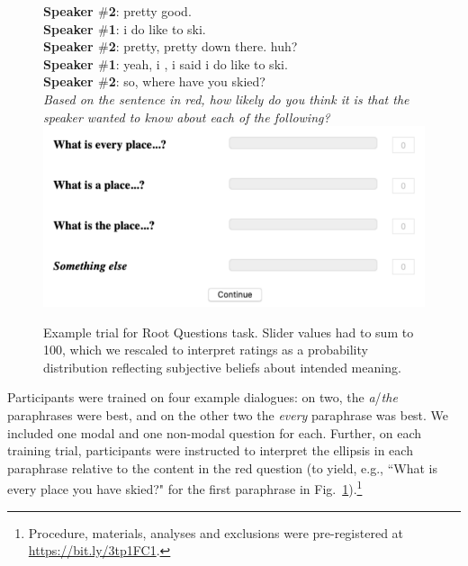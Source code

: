 \documentclass[12pt,letterpaper,table,svgnames,dvipsnames]{article}
\newcommand{\figref}[1]{Fig.~\ref{#1}}
\begin{document}
\begin{figure}%
\begin{tcolorbox}[colback=white]
\textbf{Speaker $\#$2}: pretty good.\\
\textbf{Speaker $\#$1}: i do like to ski.\\
\textbf{Speaker $\#$2}: pretty, pretty down there. huh?\\
\textbf{Speaker $\#$1}: yeah, i , i said i do like to ski.\\
\textbf{Speaker $\#$2}: \color{red}so, where have you skied?\color{black}\\

\noindent \emph{Based on the sentence in red, how likely do you think it is that the speaker wanted to know about each of the following?}\\

\includegraphics[scale=.52]{figures/sliders_rq.png}
\end{tcolorbox}
\caption{Example trial for Root Questions task. Slider values had to sum to 100, which we rescaled to interpret ratings as a probability distribution reflecting subjective beliefs about intended meaning.}
\label{trial-ex1a}
\end{figure}


Participants were trained on four example dialogues: on two, the \emph{a}/\emph{the} paraphrases were best, and on the other two the \emph{every} paraphrase was best. We included one modal and one non-modal question for each. Further, on each training trial, participants were instructed to interpret the ellipsis in each paraphrase relative to the content in the red question (to yield, e.g., ``What is every place you have skied?" for the first paraphrase in \figref{trial-ex1a}).\footnote{Procedure, materials, analyses and exclusions were pre-registered at \url{https://bit.ly/3tp1FC1}.}
\end{document}
